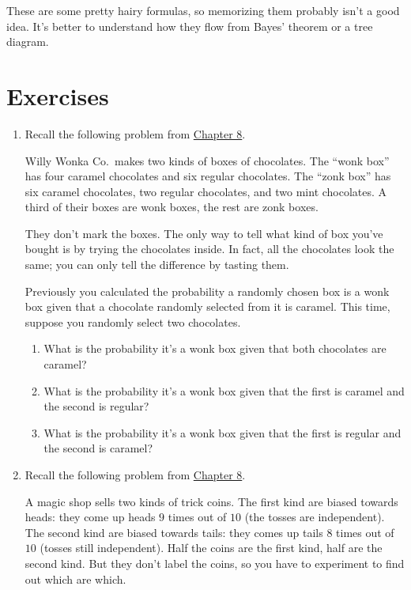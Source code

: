 \documentclass[justified]{tufte-book}
\providecommand{\tightlist}{%
  \setlength{\itemsep}{0pt}\setlength{\parskip}{0pt}}
\theoremstyle{definition}
\theoremstyle{definition}
\theoremstyle{definition}
\theoremstyle{definition}
\theoremstyle{remark}
\begin{document}
These are some pretty hairy formulas, so memorizing them probably isn't a good idea. It's better to understand how they flow from Bayes' theorem or a tree diagram.

\hypertarget{exercises-7}{%
\section*{Exercises}\label{exercises-7}}

\begin{enumerate}
\item
  Recall the following problem from \protect\hyperlink{bayes-theorem}{Chapter 8}.

  Willy Wonka Co.~makes two kinds of boxes of chocolates. The ``wonk box'' has four caramel chocolates and six regular chocolates. The ``zonk box'' has six caramel chocolates, two regular chocolates, and two mint chocolates. A third of their boxes are wonk boxes, the rest are zonk boxes.

  They don't mark the boxes. The only way to tell what kind of box you've bought is by trying the chocolates inside. In fact, all the chocolates look the same; you can only tell the difference by tasting them.

  Previously you calculated the probability a randomly chosen box is a wonk box given that a chocolate randomly selected from it is caramel. This time, suppose you randomly select two chocolates.

  \begin{enumerate}
  \def\labelenumii{\alph{enumii}.}
  \tightlist
  \item
    What is the probability it's a wonk box given that both chocolates are caramel?
  \item
    What is the probability it's a wonk box given that the first is caramel and the second is regular?
  \item
    What is the probability it's a wonk box given that the first is regular and the second is caramel?
  \end{enumerate}
\item
  Recall the following problem from \protect\hyperlink{bayes-theorem}{Chapter 8}.

  A magic shop sells two kinds of trick coins. The first kind are biased towards heads: they come up heads \(9\) times out of \(10\) (the tosses are independent). The second kind are biased towards tails: they comes up tails \(8\) times out of \(10\) (tosses still independent). Half the coins are the first kind, half are the second kind. But they don't label the coins, so you have to experiment to find out which are which.


\end{enumerate}
\end{document}
